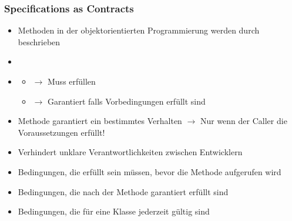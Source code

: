 \subsubsection*{Specifications as Contracts}
\begin{infoBox}[title=Spezifikationen als Verträge (\enquote{Design by Contract})]
    \begin{itemize}
        \item {} Methoden in der objektorientierten Programmierung werden durch  beschrieben
        \item {}
        \item {}
        \begin{itemize}
            \item {} $\rightarrow$ Muss  erfüllen
            \item {} $\rightarrow$ Garantiert  falls Vorbedingungen erfüllt sind
        \end{itemize}
    \end{itemize}
\end{infoBox}
\begin{infoBox}[title=\enquote{Design by Contract} (Meyer\, 1992\, Eiffel)]
    \begin{itemize}
        \item Methode garantiert ein bestimmtes Verhalten $\rightarrow$ Nur wenn der Caller die Voraussetzungen erfüllt!
        \item Verhindert unklare Verantwortlichkeiten zwischen Entwicklern
    \end{itemize}
    \begin{itemize}
        \item {} Bedingungen, die erfüllt sein müssen, bevor die Methode aufgerufen wird
        \item {} Bedingungen, die nach der Methode garantiert erfüllt sind
        \item {} Bedingungen, die für eine Klasse jederzeit gültig sind
    \end{itemize}
\end{infoBox}
